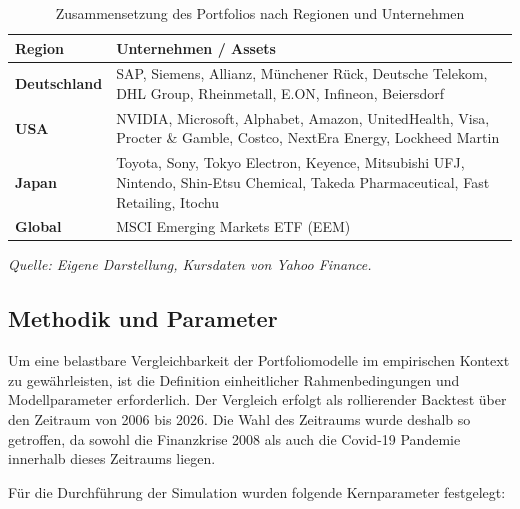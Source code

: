 \documentclass[parskip=half]{scrartcl}
\begin{document}
	\begin{table}[htbp]
		\centering
		\caption{Zusammensetzung des Portfolios nach Regionen und Unternehmen}
		\label{tab:portfolio_names}
		\small %
		\begin{tabularx}{\textwidth}{|l|X|}
			\hline
			\textbf{Region} & \textbf{Unternehmen / Assets} \\ \hline
			\textbf{Deutschland} & SAP, Siemens, Allianz, Münchener Rück, Deutsche Telekom, DHL Group, Rheinmetall, E.ON, Infineon, Beiersdorf \\ \hline
			\textbf{USA} & NVIDIA, Microsoft, Alphabet, Amazon, UnitedHealth, Visa, Procter \& Gamble, Costco, NextEra Energy, Lockheed Martin \\ \hline
			\textbf{Japan} & Toyota, Sony, Tokyo Electron, Keyence, Mitsubishi UFJ, Nintendo, Shin-Etsu Chemical, Takeda Pharmaceutical, Fast Retailing, Itochu \\ \hline
			\textbf{Global} & MSCI Emerging Markets ETF (EEM) \\ \hline
		\end{tabularx}
		\vspace{5pt}
		\par\textit{Quelle: Eigene Darstellung, Kursdaten von Yahoo Finance.}
	\end{table}
	
	\subsection{Methodik und Parameter}
	
	Um eine belastbare Vergleichbarkeit der Portfoliomodelle im empirischen Kontext zu gewährleisten, ist die Definition einheitlicher Rahmenbedingungen und Modellparameter erforderlich. Der Vergleich erfolgt als rollierender Backtest über den Zeitraum von 2006 bis 2026. Die Wahl des Zeitraums wurde deshalb so getroffen, da sowohl die Finanzkrise 2008 als auch die Covid-19 Pandemie innerhalb dieses Zeitraums liegen.
	
	Für die Durchführung der Simulation wurden folgende Kernparameter festgelegt:
	
\end{document}
